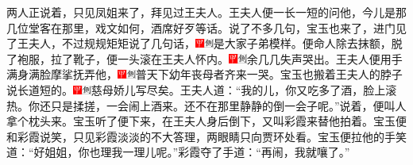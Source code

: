 两人正说着，只见凤姐来了，拜见过王夫人。王夫人便一长一短的问他，今儿是那几位堂客在那里，戏文如何，酒席好歹等话。说了不多几句，宝玉也来了，进门见了王夫人，不过规规矩矩说了几句话，{\includegraphics[width=3mm]{../Images/00002}\includegraphics[width=3mm]{../Images/00011}\footnotesize \kaishu 是大家子弟模样。}便命人除去抹额，脱了袍服，拉了靴子，便一头滚在王夫人怀内。{\includegraphics[width=3mm]{../Images/00002}\includegraphics[width=3mm]{../Images/00011}\footnotesize \kaishu 余几几失声哭出。}王夫人便用手满身满脸摩挲抚弄他，{\includegraphics[width=3mm]{../Images/00002}\includegraphics[width=3mm]{../Images/00011}\footnotesize \kaishu 普天下幼年丧母者齐来一哭。}宝玉也搬着王夫人的脖子说长道短的。{\includegraphics[width=3mm]{../Images/00002}\includegraphics[width=3mm]{../Images/00011}\footnotesize \kaishu 慈母娇儿写尽矣。}王夫人道：``我的儿，你又吃多了酒，脸上滚热。你还只是揉搓，一会闹上酒来。还不在那里静静的倒一会子呢。''说着，便叫人拿个枕头来。宝玉听了便下来，在王夫人身后倒下，又叫彩霞来替他拍着。宝玉便和彩霞说笑，只见彩霞淡淡的不大答理，两眼睛只向贾环处看。宝玉便拉他的手笑道：``好姐姐，你也理我一理儿呢。''彩霞夺了手道：``再闹，我就嚷了。''

